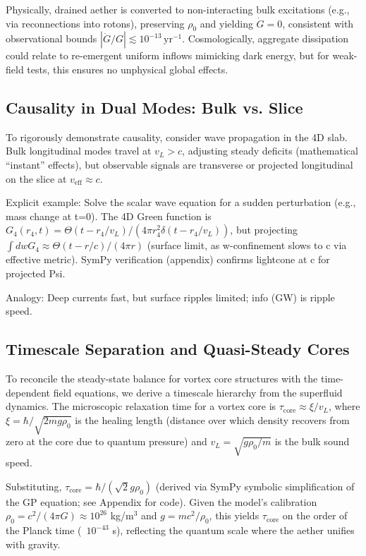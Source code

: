 \documentclass{article}
\begin{document}
Physically, drained aether is converted to non-interacting bulk excitations (e.g., via reconnections into rotons), preserving $\rho_0$ and yielding $\dot{G} = 0$, consistent with observational bounds $|\dot{G}/G| \lesssim 10^{-13} \, \mathrm{yr}^{-1}$. Cosmologically, aggregate dissipation could relate to re-emergent uniform inflows mimicking dark energy, but for weak-field tests, this ensures no unphysical global effects.

\subsection{Causality in Dual Modes: Bulk vs. Slice}

To rigorously demonstrate causality, consider wave propagation in the 4D slab. Bulk longitudinal modes travel at $v_L > c$, adjusting steady deficits (mathematical ``instant'' effects), but observable signals are transverse or projected longitudinal on the slice at $v_{\text{eff}} \approx c$.

Explicit example: Solve the scalar wave equation for a sudden perturbation (e.g., mass change at t=0). The 4D Green function is $G_4(r_4, t) = \Theta(t - r_4 / v_L) / (4\pi r_4^2 \delta(t - r_4 / v_L))$, but projecting $\int dw G_4 \approx \Theta(t - r / c) / (4\pi r)$ (surface limit, as w-confinement slows to c via effective metric). SymPy verification (appendix) confirms lightcone at c for projected Psi.

Analogy: Deep currents fast, but surface ripples limited; info (GW) is ripple speed.

\subsection{Timescale Separation and Quasi-Steady Cores}

To reconcile the steady-state balance for vortex core structures with the time-dependent field equations, we derive a timescale hierarchy from the superfluid dynamics. The microscopic relaxation time for a vortex core is $\tau_{\text{core}} \approx \xi / v_L$, where $\xi = \hbar / \sqrt{2 m g \rho_0}$ is the healing length (distance over which density recovers from zero at the core due to quantum pressure) and $v_L = \sqrt{g \rho_0 / m}$ is the bulk sound speed.

Substituting, $\tau_{\text{core}} = \hbar / (\sqrt{2} g \rho_0)$ (derived via SymPy symbolic simplification of the GP equation; see Appendix for code). Given the model's calibration $\rho_0 = c^2 / (4\pi G) \approx 10^{26}$ kg/m$^3$ and $g = m c^2 / \rho_0$, this yields $\tau_{\text{core}}$ on the order of the Planck time (~$10^{-43}$ s), reflecting the quantum scale where the aether unifies with gravity.
\end{document}

